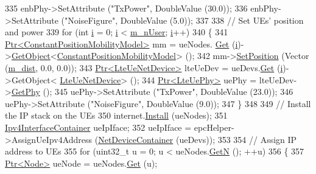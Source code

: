 \begin{DoxyCode}
335   enbPhy->SetAttribute (\textcolor{stringliteral}{"TxPower"}, DoubleValue (30.0));
336   enbPhy->SetAttribute (\textcolor{stringliteral}{"NoiseFigure"}, DoubleValue (5.0));
337 
338   \textcolor{comment}{// Set UEs' position and power}
339   \textcolor{keywordflow}{for} (\textcolor{keywordtype}{int} \hyperlink{bernuolliDistribution_8m_a6f6ccfcf58b31cb6412107d9d5281426}{i} = 0; \hyperlink{bernuolliDistribution_8m_a6f6ccfcf58b31cb6412107d9d5281426}{i} < \hyperlink{classLenaFdTbfqFfMacSchedulerTestCase1_a95ad259ccc1d4dbc869d81fc7941406e}{m\_nUser}; \hyperlink{bernuolliDistribution_8m_a6f6ccfcf58b31cb6412107d9d5281426}{i}++)
340     \{
341       \hyperlink{classns3_1_1Ptr}{Ptr<ConstantPositionMobilityModel>} mm = ueNodes.
      \hyperlink{classns3_1_1NodeContainer_a9ed96e2ecc22e0f5a3d4842eb9bf90bf}{Get} (\hyperlink{bernuolliDistribution_8m_a6f6ccfcf58b31cb6412107d9d5281426}{i})->\hyperlink{classns3_1_1Object_a13e18c00017096c8381eb651d5bd0783}{GetObject}<\hyperlink{classns3_1_1ConstantPositionMobilityModel}{ConstantPositionMobilityModel}> ();
342       mm->\hyperlink{classns3_1_1MobilityModel_ac584b3d5a309709d2f13ed6ada1e7640}{SetPosition} (Vector (\hyperlink{classLenaFdTbfqFfMacSchedulerTestCase1_ac9a9bc14eb52017ac26277d7825bc85e}{m\_dist}, 0.0, 0.0));
343       \hyperlink{classns3_1_1Ptr}{Ptr<LteUeNetDevice>} lteUeDev = ueDevs.\hyperlink{classns3_1_1NetDeviceContainer_a677d62594b5c9d2dea155cc5045f4d0b}{Get} (\hyperlink{bernuolliDistribution_8m_a6f6ccfcf58b31cb6412107d9d5281426}{i})->GetObject<
      \hyperlink{classns3_1_1LteUeNetDevice}{LteUeNetDevice}> ();
344       \hyperlink{classns3_1_1Ptr}{Ptr<LteUePhy>} uePhy = lteUeDev->\hyperlink{classns3_1_1LteUeNetDevice_a2a9940a1e457a8bf3dae87fed4199c7a}{GetPhy} ();
345       uePhy->SetAttribute (\textcolor{stringliteral}{"TxPower"}, DoubleValue (23.0));
346       uePhy->SetAttribute (\textcolor{stringliteral}{"NoiseFigure"}, DoubleValue (9.0));
347     \}
348 
349   \textcolor{comment}{// Install the IP stack on the UEs}
350   internet.\hyperlink{classns3_1_1InternetStackHelper_a6645b412f31283d2d9bc3d8a95cebbc0}{Install} (ueNodes);
351   \hyperlink{classns3_1_1Ipv4InterfaceContainer}{Ipv4InterfaceContainer} ueIpIface;
352   ueIpIface = epcHelper->AssignUeIpv4Address (\hyperlink{classns3_1_1NetDeviceContainer}{NetDeviceContainer} (ueDevs));
353 
354   \textcolor{comment}{// Assign IP address to UEs}
355   \textcolor{keywordflow}{for} (uint32\_t u = 0; u < ueNodes.\hyperlink{classns3_1_1NodeContainer_aed647ac56d0407a7706aba02eb44b951}{GetN} (); ++u)
356     \{
357       \hyperlink{classns3_1_1Ptr}{Ptr<Node>} ueNode = ueNodes.\hyperlink{classns3_1_1NodeContainer_a9ed96e2ecc22e0f5a3d4842eb9bf90bf}{Get} (u);

\end{DoxyCode}
